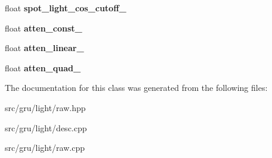 \begin{DoxyCompactItemize}
\item 
\hypertarget{classglutpp_1_1light_1_1raw_a95ff4f47036d288753adf1af64eb2b96}{float {\bfseries spot\-\_\-light\-\_\-cos\-\_\-cutoff\-\_\-}}\label{classglutpp_1_1light_1_1raw_a95ff4f47036d288753adf1af64eb2b96}

\item 
\hypertarget{classglutpp_1_1light_1_1raw_a11158655fbf3292e6c63aa127e5b1b93}{float {\bfseries atten\-\_\-const\-\_\-}}\label{classglutpp_1_1light_1_1raw_a11158655fbf3292e6c63aa127e5b1b93}

\item 
\hypertarget{classglutpp_1_1light_1_1raw_aa4b209c2c061da557e02c996ebb052a3}{float {\bfseries atten\-\_\-linear\-\_\-}}\label{classglutpp_1_1light_1_1raw_aa4b209c2c061da557e02c996ebb052a3}

\item 
\hypertarget{classglutpp_1_1light_1_1raw_ae86cc622a59f30f2ec79fe342e3597a7}{float {\bfseries atten\-\_\-quad\-\_\-}}\label{classglutpp_1_1light_1_1raw_ae86cc622a59f30f2ec79fe342e3597a7}

\end{DoxyCompactItemize}


\-The documentation for this class was generated from the following files\-:\begin{DoxyCompactItemize}
\item 
src/gru/light/raw.\-hpp\item 
src/gru/light/desc.\-cpp\item 
src/gru/light/raw.\-cpp\end{DoxyCompactItemize}
